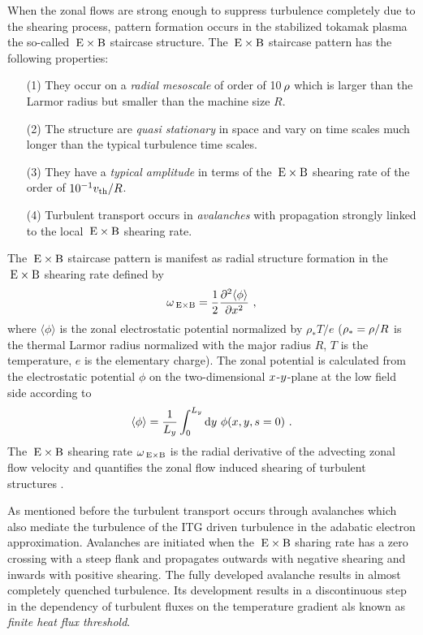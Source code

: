 When the zonal flows are strong enough to suppress turbulence completely due to the shearing process, pattern formation occurs in the stabilized tokamak plasma the so-called $\mathrm{\:E}\times\mathrm{B}$ staircase structure. The $\mathrm{\:E}\times\mathrm{B}$ staircase pattern has the following properties:
\begin{enumerate}
	\item[(1)] They occur on a \textit{radial mesoscale} of order of 10\,$\rho$ which is larger than the Larmor radius but smaller than the machine size $R$.
	\item[(2)] The structure are \textit{quasi stationary} in space and vary on time scales much longer than the typical turbulence time scales.
	\item[(3)] They have a \textit{typical amplitude} in terms of the $\mathrm{\:E}\times\mathrm{B}$ shearing rate of the order of $10^{-1} v_{\mathrm{th}}/R$.
	\item[(4)] Turbulent transport occurs in \textit{avalanches} with propagation strongly linked to the local $\mathrm{\:E}\times\mathrm{B}$ shearing rate. \cite{McMillan2009}
\end{enumerate} \bigskip

The $\mathrm{\:E}\times\mathrm{B}$ staircase pattern is manifest as radial structure formation in the $\mathrm{\:E}\times\mathrm{B}$ shearing rate defined by\cite{Rath2016, Pueschel2008, Peeters2016}
\begin{equation}
	\omega_{\mathrm{\:E \times B}} = \frac{1}{2} \frac{\partial^2 \langle \phi \rangle}{\partial x^2}~,
	\label{eq:shearingrate}
\end{equation}
where $\langle \phi \rangle$ is the zonal electrostatic potential normalized by $\rho_\ast T/e$ ($\rho_\ast = \rho/R$ is the thermal Larmor radius normalized with the major radius $R$, $T$ is the temperature, $e$ is the elementary charge).
The zonal potential is calculated from the electrostatic potential $\phi$ on the two-dimensional $x$-$y$-plane at the low field side according to\cite{Rath2021}
\begin{equation}
\langle \phi \rangle = \frac{1}{L_y} \int_0^{L_y} \mathrm{d}y ~ \phi(x,y,s=0)~.
\end{equation}
The $\mathrm{\:E}\times\mathrm{B}$ shearing rate $\omega_{\mathrm{\:E \times B}}$ is the radial derivative of the advecting zonal flow velocity \cite{Hahm1995, Waltz1998} and quantifies the zonal flow induced shearing of turbulent structures \cite{Biglari1990, Hahm1995, Burnell1997}. \\ \bigskip

As mentioned before the turbulent transport occurs through avalanches which also mediate the turbulence of the ITG driven turbulence in the adabatic electron approximation. Avalanches are initiated when the $\mathrm{\:E}\times\mathrm{B}$ sharing rate has a zero crossing with a steep flank and propagates outwards with negative shearing and inwards with positive shearing. \cite{Idomura2009,McMillan2009} The fully developed avalanche results in almost completely quenched turbulence. Its development results in a discontinuous step in the dependency of turbulent fluxes on the temperature gradient als known as \textit{finite heat flux threshold}. \cite{Peeters2016,Weikl2017}